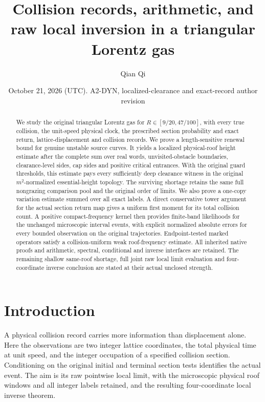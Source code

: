 \documentclass[11pt,reqno]{amsart}
\title[Collision records and raw local inversion]{Collision records, arithmetic, and raw local inversion in a triangular Lorentz gas}
\author{Qian Qi}
\date{October 21, 2026 (UTC). A2-DYN, localized-clearance and exact-record author revision}
\numberwithin{equation}{section}
\theoremstyle{definition}\newtheorem{definition}[theorem]{Definition}
\theoremstyle{remark}\newtheorem{remark}[theorem]{Remark}
\begin{document}
\raggedbottom
\begin{abstract}
We study the original triangular Lorentz gas for
$R\in[9/20,47/100]$, with every true collision, the unit-speed
physical clock, the prescribed section probability and exact
return, lattice-displacement and collision records. We prove a
length-sensitive renewal bound for genuine unstable source curves.
It yields a localized physical-roof height estimate after the
complete sum over real words, unvisited-obstacle boundaries,
clearance-level sides, cap sides and positive critical entrances.
With the original guard thresholds, this estimate pays every
sufficiently deep clearance witness in the original $m^2$-normalized
essential-height topology. The surviving shortage retains the
same full nongrazing comparison pool and the original order of limits.
We also prove a one-copy variation estimate summed over all exact
labels. A direct conservative tower argument for the actual section
return map gives a uniform first moment for its total collision
count. A positive compact-frequency kernel then provides finite-band
likelihoods for the unchanged microscopic interval events, with
explicit normalized absolute errors for every bounded observation
on the original trajectories. Endpoint-tested marked operators
satisfy a collision-uniform weak roof-frequency estimate.
All inherited native proofs and arithmetic, spectral, conditional
and inverse interfaces are retained. The remaining shallow
same-roof shortage, full joint raw local limit evaluation and
four-coordinate inverse conclusion are stated at their actual
unclosed strength.
\end{abstract}
\maketitle

\section*{Introduction}
A physical collision record carries more information than displacement
alone. Here the observations are two integer lattice coordinates, the
total physical time at unit speed, and the integer occupation of a
specified collision section. Conditioning on the original initial
and terminal section tests identifies the actual event. The aim is
its raw pointwise local limit, with the microscopic physical roof
windows and all integer labels retained, and the resulting
four-coordinate local inverse theorem.
\end{document}

